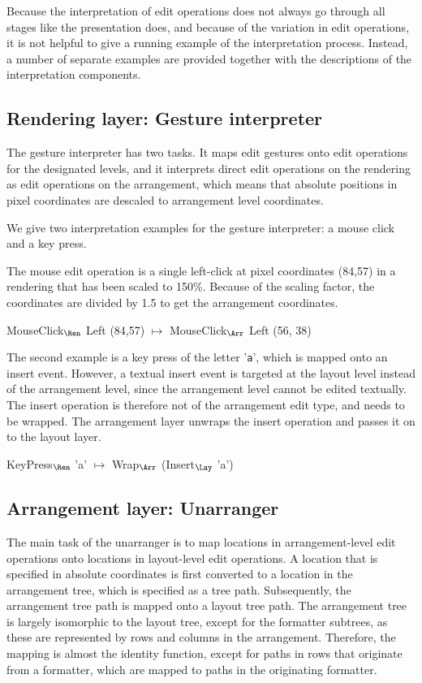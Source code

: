 Because the interpretation of edit operations does not always go through all stages like the presentation does, and because of the variation in edit operations, it is not helpful to give a running example of the interpretation process. Instead, a number of separate examples are provided together with the descriptions of the interpretation components.

%																
\subsection{Rendering layer: Gesture interpreter} \label{sect:gestureInterpreter}

The gesture interpreter has two tasks. It maps edit gestures onto edit operations for the designated levels, and it interprets direct edit operations on the rendering as edit operations on the arrangement, which means that absolute positions in pixel coordinates are descaled to arrangement level coordinates. 

We give two interpretation examples for the gesture interpreter: a mouse click and a key press. 

The mouse edit operation is a single left-click at pixel coordinates (84,57) in a rendering that has been scaled to 150\%.
Because of the scaling factor, the coordinates are divided by 1.5 to get the arrangement coordinates.

\ttfamily
MouseClick$_{\Ren}$ Left (84,57) $\mapsto$ MouseClick$_{\Arr}$ Left (56, 38)\\
\rmfamily

The second example is a key press of the letter '\verb|a|', which is mapped onto an insert event. However, a textual insert event is targeted at the layout level instead of the arrangement level, since the arrangement level cannot be edited textually. The insert operation is therefore not of the arrangement edit type, and needs to be wrapped. The arrangement layer unwraps the insert operation and passes it on to the layout layer.

\ttfamily
KeyPress$_{\Ren}$ 'a' $\mapsto$ Wrap$_{\Arr}$ (Insert$_{\Lay}$ 'a')
\rmfamily


%																
\subsection{Arrangement layer: Unarranger}

The main task of the unarranger is to map locations in arrangement-level edit operations onto locations in layout-level edit operations. A location that is specified in absolute coordinates is first converted to a location in the arrangement tree, which is specified as a tree path. Subsequently, the arrangement tree path is mapped onto a layout tree path. The arrangement tree is largely isomorphic to the layout tree, except for the formatter subtrees, as these are represented by rows and columns in the arrangement. Therefore, the mapping is almost the identity function, except for paths in rows that originate from a formatter, which are mapped to paths in the originating formatter.

